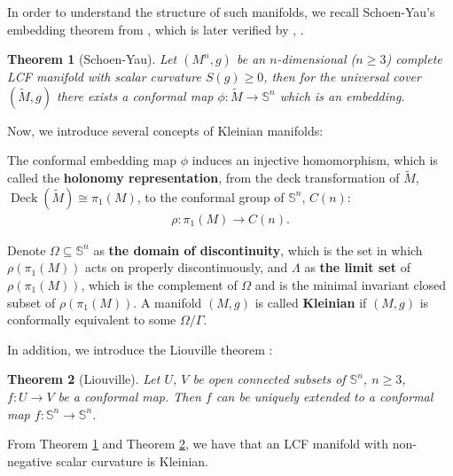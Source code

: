 \documentclass[12pt]{amsart}
\newtheorem{theorem}{Theorem}[section]
\theoremstyle{definition}
\begin{document}
In order to understand the structure of such manifolds, we recall Schoen-Yau's embedding theorem from \cite{SYconformal}, which is later verified by \cite{ChodoshLi}, \cite{LUS}.
\begin{theorem}[Schoen-Yau]\label{thm SY}
    Let $(M^n,g)$ be an $n$-dimensional ($n\geq 3$) complete LCF manifold with scalar curvature $S(g)\geq 0$, then for the universal cover $(\tilde{M},g)$ there exists a conformal map $\phi:\tilde{M}\to \mathbb{S}^n$ which is an embedding.
\end{theorem}

Now, we introduce several concepts of Kleinian manifolds:

The conformal embedding map $\phi$ induces an injective homomorphism, which is called the \textbf{holonomy representation}, from the deck transformation of $\tilde{M}$, $\operatorname{Deck}(\tilde{M})\cong \pi_1(M)$, to the conformal group of $\mathbb{S}^n$, $C(n)$:
\begin{align*}
        \rho:\pi_1(M)\to C(n).
\end{align*}

Denote $\Omega\subseteq\mathbb{S}^n$ as \textbf{the domain of discontinuity}, which is the set in which $\rho(\pi_1(M))$ acts on properly discontinuously, and $\Lambda$ as \textbf{the limit set} of $\rho(\pi_1(M))$, which is the complement of $\Omega$ and is the minimal invariant closed subset of $\rho(\pi_1(M))$. A manifold $(M,g)$ is called \textbf{Kleinian} if $(M,g)$ is conformally equivalent to some $\Omega/\Gamma$. 

In addition, we introduce the Liouville theorem \cite{conformalbook}:
\begin{theorem}[Liouville]\label{thm L}
    Let $U$, $V$ be open connected subsets of $\mathbb{S}^n$, $n\geq 3$, $f:U\to V$ be a conformal map. Then $f$ can be uniquely extended to a conformal map $f:\mathbb{S}^n\to \mathbb{S}^n$.
\end{theorem}

From Theorem \ref{thm SY} and Theorem \ref{thm L}, we have that an LCF manifold with non-negative scalar curvature is Kleinian.
\end{document}
